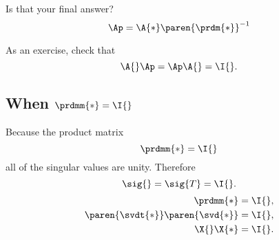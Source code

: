 Is that your final answer?
\begin{equation}
  \Ap = \A{*}\paren{\prdm{*}}^{-1}
\end{equation}

As an exercise, check that
\begin{equation}
  \A{}\Ap = \Ap\A{} = \I{}.
\end{equation}

\subsection{When $\prdmm{*}=\I{}$}
Because the product matrix
\begin{equation}
  \prdmm{*} = \I{}
\end{equation}
all of the singular values are unity. Therefore
\begin{equation}
  \sig{}=\sig{T}=\I{}.
\end{equation}
\begin{equation}
  \begin{split}
    \prdmm{*}&=\I{},\\
    \paren{\svdt{*}}\paren{\svd{*}}&=\I{},\\
    \X{}\X{*}&=\I{}.
  \end{split}
\end{equation}

	
\endinput